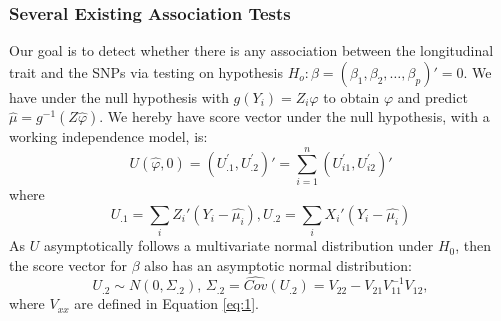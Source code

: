 \documentclass[12pt]{article}
\begin{document}
\subsubsection{Several Existing Association Tests}
Our goal is to detect whether there is any association between the longitudinal trait and the SNPs via testing on hypothesis $H_{o}:\beta=(\beta_{1},\beta_{2},\ldots,\beta_{p})'=0$. We have under the null hypothesis with $g(Y_i)=Z_i\varphi$ to obtain $\varphi$ and predict $\hat{\mu}=g^{-1}(Z\hat{\varphi})$. We hereby have score vector under the null hypothesis, with a working independence model, is:
$$U(\hat{\varphi},0)=(U_{.1}^{'}, U_{.2}^{'})'=\sum_{i=1}^{n}(U_{i1}^{'},U_{i2}^{'})'$$
where
$$U_{.1}=\sum_{i}Z_{i}'(Y_{i}-\hat{\mu_{i}}), U_{.2}=\sum_{i}X_{i}'(Y_{i}-\hat{\mu_{i}})$$ 
As $U$ asymptotically follows a multivariate normal distribution under $H_{0}$, then the score vector for $\beta$ also has an asymptotic normal distribution:\\
$$
U_{.2}\sim N(0,\Sigma_{.2}),\,\Sigma_{.2}= \widehat{Cov} (U_{.2}) = V_{22} - V_{21} V_{11}^{-1} V_{12} ,
$$where $V_{xx}$ are defined in Equation \ref{eq:1}.
\end{document}
